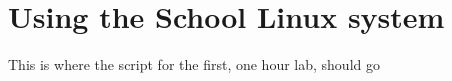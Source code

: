 \chapter{Using the School Linux system}

\begin{note}
  This is where the script for the first, one hour lab, should go
\end{note}

